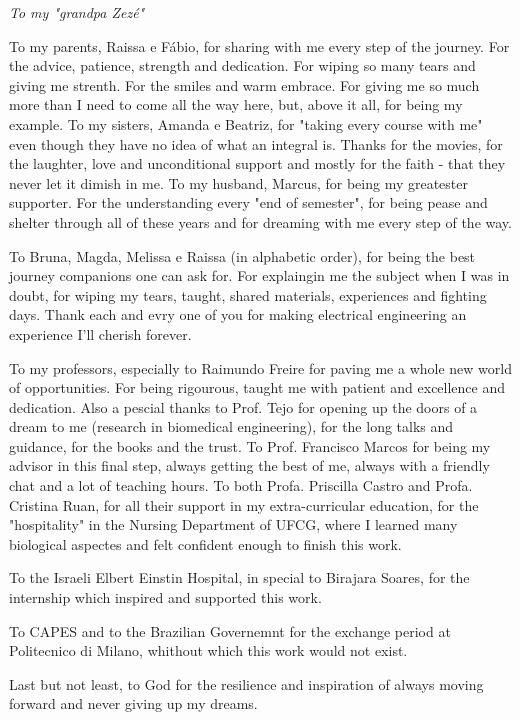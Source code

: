 \documentclass[
	12pt,				%
	openright,			%
	twoside,			%
	a4paper,			%
	english,			%
	french,				%
	spanish,			%
	brazil				%
	]{abntex2}
\begin{document}
\begin{dedicatoria}
   \vspace*{\fill}
   \centering
   \noindent
   \textit{ To my "grandpa Zez\'e"} \vspace*{\fill}
\end{dedicatoria}

\begin{agradecimentos}
To my parents, Raissa e Fábio, for sharing with me every step of the journey. For the advice, patience, strength and dedication. For wiping so many tears and giving me strenth. For the smiles and warm embrace. For giving me so much more than I need to come all the way here, but, above it all, for being my example. To my sisters, Amanda e Beatriz, for "taking every course with me" even though they have no idea of what an integral is. Thanks for the movies, for the laughter, love and unconditional support and mostly for the faith - that they never let it dimish in me. To my husband, Marcus, for being my greatester supporter. For the understanding every "end of semester", for being pease and shelter through all of these years and for dreaming with me every step of the way.

To Bruna, Magda, Melissa e Raissa (in alphabetic order), for being the best journey companions one can ask for. For explaingin me the subject when I was in doubt, for wiping my tears, taught, shared materials, experiences and fighting days. Thank each and evry one of you for making electrical engineering an experience I'll cherish forever. 

	To my professors, especially to Raimundo Freire for paving me a whole new world of opportunities. For being rigourous, taught me with patient and excellence and dedication. Also a pescial thanks to Prof. Tejo for opening up the doors of a dream to me (research in biomedical engineering), for the long talks and guidance, for the books and the trust. To Prof. Francisco Marcos for being my advisor in this final step, always getting the best of me, always with a friendly chat and a lot of teaching hours. To both Profa. Priscilla Castro and Profa. Cristina Ruan, for all their support in my extra-curricular education, for the "hospitality" in the Nursing Department of UFCG, where I learned many biological aspectes and felt confident enough to finish this work.
	
	
To the Israeli Elbert Einstin Hospital, in special to Birajara Soares, for the internship which inspired and supported this work. 

To CAPES and to the Brazilian Governemnt for the exchange period at Politecnico di Milano, whithout which this work would not exist.

Last but not least, to God for the resilience and inspiration of always moving forward and never giving up my dreams.


\end{agradecimentos}
\end{document}
